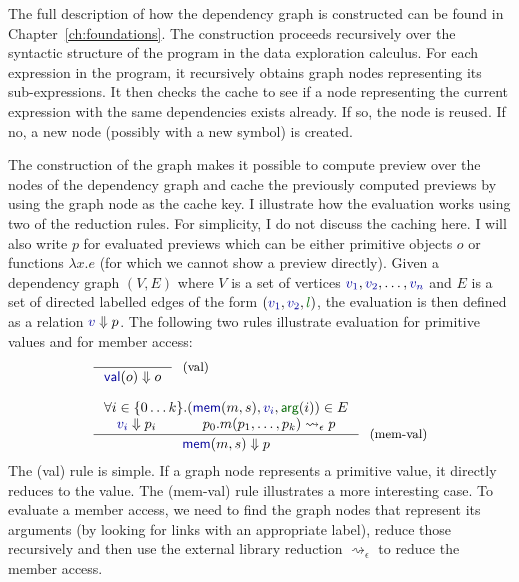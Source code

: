 \documentclass[fleqn,11pt]{report}
\newcommand{\bndclr}[1]{\textcolor{kvdclr}{#1}}
\newcommand{\blblclr}[1]{\textcolor{numclr}{#1}}
\newcommand{\bnd}[1]{\textnormal{\textcolor{kvdclr}{\sffamily #1}}}
\newcommand{\blbl}[1]{\textnormal{\textcolor{numclr}{\sffamily #1}}}
\theoremstyle{definition}
\begin{document}
The full description of how the dependency graph is constructed can be found in
Chapter~\ref{ch:foundations}. The construction proceeds recursively over the syntactic structure
of the program in the data exploration calculus. For each expression in the program, it recursively
obtains graph nodes representing its sub-expressions. It then checks the cache to see if a node
representing the current expression with the same dependencies exists already. If so, the node is
reused. If no, a new node (possibly with a new symbol) is created.

The construction of the graph makes it possible to compute preview over the nodes of the
dependency graph and cache the previously computed previews by using the graph node as the cache
key. I illustrate how the evaluation works using two of the reduction rules. For simplicity,
I do not discuss the caching here. I will also write $p$ for evaluated previews which can be either
primitive objects $o$ or functions $\lambda x.e$ (for which we cannot show a preview directly).
Given a dependency graph $(V, E)$ where $V$ is a set of vertices $\bndclr{v_1}, \bndclr{v_2}, \ldots, \bndclr{v_n}$
and $E$ is a set of directed labelled edges of the form $(\bndclr{v_1}, \bndclr{v_2}, \blblclr{l})$,
the evaluation is then defined as a relation $\bndclr{v} \Downarrow p$. The following two rules
illustrate evaluation for primitive values and for member access:
%
\begin{equation*}
\begin{array}{l}
\inference
  {~}
  {\bnd{val}(o) \Downarrow o }~~\text{\small (val)}
\\~\\
\inference
  { \forall i\in\{0\ldots k\}.(\bnd{mem}(m, s), \bndclr{v_i}, \blbl{arg}(i)) \in E \\
    \bndclr{v_i} \Downarrow p_i & p_0.m(p_1, \ldots, p_k) \rightsquigarrow_\epsilon p }
  { \bnd{mem}(m, s) \Downarrow p }~~\text{\small (mem-val)}
\end{array}
\end{equation*}
%
The (val) rule is simple. If a graph node represents a primitive value, it directly reduces to
the value. The (mem-val) rule illustrates a more interesting case. To evaluate a member access,
we need to find the graph nodes that represent its arguments (by looking for links with an
appropriate label), reduce those recursively and then use the external library reduction
$\rightsquigarrow_\epsilon$ to reduce the member access.
\end{document}
